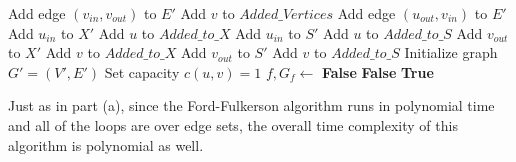 \documentclass{article}
\begin{document}
\begin{itemize}
\begin{algorithm}[H]
\begin{algorithmic}[1]
              \State Add edge $(v_{in}, v_{out})$ to $E'$
              \State Add $v$ to $Added\_Vertices$
            \EndIf
            \State Add edge $(u_{out}, v_{in})$ to $E'$
              \State Add $u_{in}$ to $X'$
              \State Add $u$ to $Added\_to\_X$
            \EndIf
              \State Add $u_{in}$ to $S'$
              \State Add $u$ to $Added\_to\_S$
            \EndIf
              \State Add $v_{out}$ to $X'$
              \State Add $v$ to $Added\_to\_X$
            \EndIf
              \State Add $v_{out}$ to $S'$
              \State Add $v$ to $Added\_to\_S$
            \EndIf
          \EndFor
          \State Initialize graph $G' = (V', E')$
            \State Set capacity $c(u, v) = 1$
          \EndFor
          \State $f, G_f \gets$ 
              \State \Return \textbf{False}
            \EndIf
              \State \Return \textbf{False}
            \EndIf
          \EndFor
          \State \Return \textbf{True}
        \EndFunction
      \end{algorithmic}
    \end{algorithm}
    Just as in part (a), since the Ford-Fulkerson algorithm runs in polynomial time and all of the loops are over edge sets, the overall time complexity of this algorithm is polynomial as well.
  \end{itemize}
\end{document}
